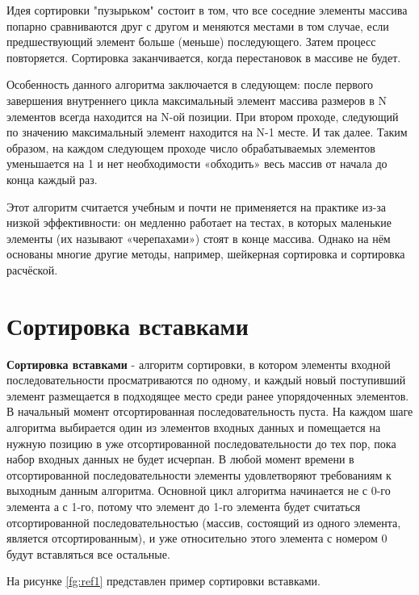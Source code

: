\documentclass[12pt]{report}
\begin{document}
Идея сортировки "пузырьком" состоит в том, что все соседние элементы массива попарно сравниваются друг с другом и меняются местами в том случае, если предшествующий элемент больше (меньше) последующего. Затем процесс повторяется. Сортировка заканчивается, когда перестановок в массиве не будет.

Особенность данного алгоритма заключается в следующем: после первого завершения внутреннего цикла максимальный элемент массива размеров в N элементов всегда находится на N-ой позиции. При втором проходе, следующий по значению максимальный элемент находится на N-1 месте. И так далее. Таким образом, на каждом следующем проходе число обрабатываемых элементов уменьшается на 1 и нет необходимости «обходить» весь массив от начала до конца каждый раз.

Этот алгоритм считается учебным и почти не применяется на практике из-за низкой эффективности: он медленно работает на тестах, в которых маленькие элементы (их называют «черепахами») стоят в конце массива. Однако на нём основаны многие другие методы, например, шейкерная сортировка и сортировка расчёской.

\section{Сортировка вставками} 

\textbf{Сортировка вставками} - алгоритм сортировки, в котором элементы входной последовательности просматриваются по одному, и каждый новый поступивший элемент размещается в подходящее место среди ранее упорядоченных элементов. В начальный момент отсортированная последовательность пуста. На каждом шаге алгоритма выбирается один из элементов входных данных и помещается на нужную позицию в уже отсортированной последовательности до тех пор, пока набор входных данных не будет исчерпан. В любой момент времени в отсортированной последовательности элементы удовлетворяют требованиям к выходным данным алгоритма.
Основной цикл алгоритма начинается не с 0-го элемента а с 1-го, потому что элемент до 1-го элемента будет считаться отсортированной последовательностью (массив, состоящий из одного элемента, является отсортированным), и уже относительно этого элемента с номером 0 будут вставляться все остальные. 

На рисунке \ref{fg:ref1} представлен пример сортировки вставками.
\begin{figure}[ht!]
\end{figure}
\end{document}
